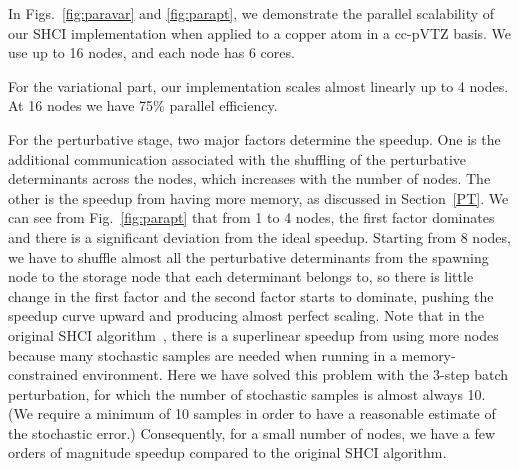 \documentclass[%
reprint,
 superscriptaddress,
 amsmath,amssymb,
 aps,
]{revtex4-1}
\begin{document}
In Figs.~\ref{fig:paravar} and \ref{fig:parapt}, we demonstrate the parallel scalability of our SHCI implementation
when applied to a copper atom in a cc-pVTZ basis. We use up to 16 nodes, and each node has 6 cores.

For the variational part, our implementation scales almost linearly up to 4 nodes.
At 16 nodes we have 75\% parallel efficiency.

For the perturbative stage, two major factors determine the speedup.
One is the additional communication associated with
the shuffling of the perturbative determinants across the nodes, which increases with the number of nodes.
The other is the speedup from having more memory, as discussed in Section~\ref{PT}.
We can see from Fig.~\ref{fig:parapt} that from 1 to 4 nodes, the first factor dominates and there is a significant deviation from the ideal speedup.
Starting from 8 nodes, we have to shuffle almost all the perturbative determinants from the spawning node to the storage node that each determinant belongs to,
so there is little change in the first factor and the second factor starts to dominate, pushing the speedup curve upward and producing almost perfect scaling.
Note that in the original SHCI algorithm~\cite{ShaHolJeaAlaUmr-JCTC-17}, there is a superlinear speedup from using more nodes
because many stochastic samples are needed when running in a memory-constrained environment.
Here we have solved this problem with the 3-step batch perturbation, for which the number of stochastic samples
is almost always 10.  (We require a minimum of 10 samples in order to have a reasonable estimate of the stochastic error.)
Consequently, for a small number of nodes, we have a few orders of magnitude speedup compared to the original SHCI algorithm.
\end{document}

